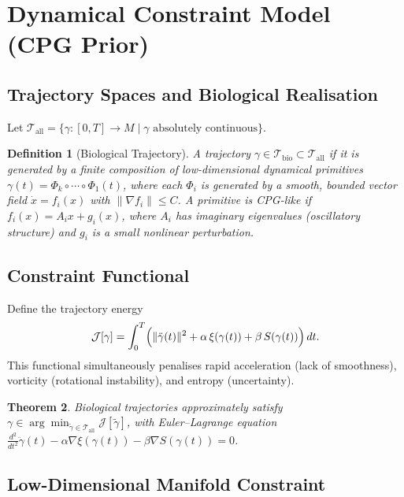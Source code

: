 \documentclass[12pt, a4paper]{article}
\newtheorem{theorem}{Theorem}[section]
\newtheorem{definition}[theorem]{Definition}
\theoremstyle{remark}
\theoremstyle{definition}
\begin{document}
\section{Dynamical Constraint Model (CPG Prior)}
\label{app:cpg}

\subsection{Trajectory Spaces and Biological Realisation}

Let $\mathcal{T}_{\mathrm{all}} = \{\gamma\colon [0,T] \to M \mid \gamma \text{ absolutely
continuous}\}$.

\begin{definition}[Biological Trajectory]
A trajectory $\gamma \in \mathcal{T}_{\mathrm{bio}} \subset \mathcal{T}_{\mathrm{all}}$
if it is generated by a finite composition of low-dimensional dynamical primitives
$\gamma(t) = \Phi_k \circ \cdots \circ \Phi_1(t)$, where each $\Phi_i$ is generated by
a smooth, bounded vector field $\dot{x} = f_i(x)$ with $\|\nabla f_i\| \le C$.
A primitive is \emph{CPG-like} if $f_i(x) = A_i x + g_i(x)$, where $A_i$ has imaginary
eigenvalues (oscillatory structure) and $g_i$ is a small nonlinear perturbation.
\end{definition}

\subsection{Constraint Functional}

Define the trajectory energy
\[
\mathcal{J}[\gamma]
= \int_0^T \Bigl(
\|\ddot{\gamma}(t)\|^2
+ \alpha\,\xi(\gamma(t))
+ \beta\,S(\gamma(t))
\Bigr)\,dt.
\]
This functional simultaneously penalises rapid acceleration (lack of smoothness), vorticity
(rotational instability), and entropy (uncertainty).

\begin{theorem}
Biological trajectories approximately satisfy
$\gamma \in \arg\min_{\tilde\gamma \in \mathcal{T}_{\mathrm{all}}} \mathcal{J}[\tilde\gamma]$,
with Euler--Lagrange equation
$\frac{d^2}{dt^2}\ddot\gamma(t) - \alpha\nabla\xi(\gamma(t)) - \beta\nabla S(\gamma(t)) = 0$.
\end{theorem}

\subsection{Low-Dimensional Manifold Constraint}
\end{document}
